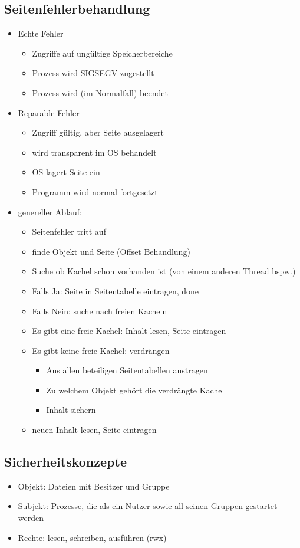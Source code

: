 \documentclass[12pt,a4paper]{article}
\begin{document}
\subsection{Seitenfehlerbehandlung}
\begin{itemize}
\item Echte Fehler
\begin{itemize}
\item Zugriffe auf ungültige Speicherbereiche
\item Prozess wird SIGSEGV zugestellt
\item Prozess wird (im Normalfall) beendet
\end{itemize}
\item Reparable Fehler
\begin{itemize}
\item Zugriff gültig, aber Seite ausgelagert
\item wird transparent im OS behandelt
\item OS lagert Seite ein
\item Programm wird normal fortgesetzt
\end{itemize}
\item genereller Ablauf:
\begin{itemize}
\item Seitenfehler tritt auf
\item finde Objekt und Seite (Offset Behandlung)
\item Suche ob Kachel schon vorhanden ist (von einem anderen Thread bspw.)
\item Falls Ja: Seite in Seitentabelle eintragen, done
\item Falls Nein: suche nach freien Kacheln
\item Es gibt eine freie Kachel: Inhalt lesen, Seite eintragen
\item Es gibt keine freie Kachel: verdrängen
\begin{itemize}
\item Aus allen beteiligen Seitentabellen austragen
\item Zu welchem Objekt gehört die verdrängte Kachel
\item Inhalt sichern
\end{itemize}
\item neuen Inhalt lesen, Seite eintragen
\end{itemize}
\end{itemize}

\subsection{Sicherheitskonzepte}
\begin{itemize}
\item Objekt: Dateien mit Besitzer und Gruppe
\item Subjekt: Prozesse, die als ein Nutzer sowie all seinen Gruppen gestartet werden
\item Rechte: lesen, schreiben, ausführen (rwx)
\end{itemize}
\end{document}
